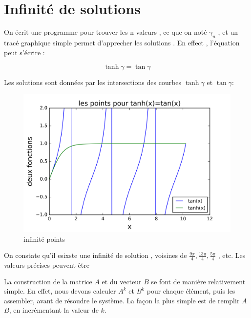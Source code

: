 \documentclass[a4paper,10pt]{report} %
\begin{document}
\section{Infinité de solutions}

On écrit une programme pour trouver les n valeurs , ce que on noté $\gamma_n$ , et un tracé graphique simple permet d'apprecher les solutions . En effect , l'équation peut s'écrire :


\begin{equation}
    \tanh{\gamma}=\tan{\gamma}
\end{equation}

Les solutions sont données par les intersections des courbes $\tanh{\gamma}$ et $\tan{\gamma}$:

\begin{figure}[H]
\centering
\includegraphics[width=1.0\textwidth]{figuretanh}
\caption{infinité points}
\label{figure1}
\end{figure}

On constate qu'il esixste une infinité de solution , voisines de $\frac{9\pi}{4},\frac{13\pi}{4},\frac{5\pi}{4}$ , etc.
Les valeurs précises peuvent être 
















La construction de la matrice $A$ et du vecteur $B$ se font de manière relativement simple. En effet, nous devons calculer $A^k$ et $B^k$ pour chaque élément, puis les assembler, avant de résoudre le système.
La façon la plus simple est de remplir $A$ $B$, en incrémentant la valeur de $k$.
\end{document}
